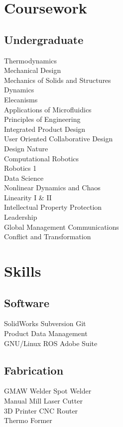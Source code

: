 \documentclass[]{deedy-resume-openfont}
\begin{document}
\begin{minipage}[t]{0.33\textwidth}
\section{Coursework}

\subsection{Undergraduate}

Thermodynamics \\
Mechanical Design \\
Mechanics of Solids and Structures \\
Dynamics \\
Elecanisms \\
Applications of Microfluidics \\
Principles of Engineering \\
Integrated Product Design\\
User Oriented Collaborative Design \\
Design Nature \\
Computational Robotics\\
Robotics 1 \\
Data Science \\
Nonlinear Dynamics and Chaos\\
Linearity I \& II\\
Intellectual Property Protection \\
Leadership \\
Global Management Communications\\
Conflict and Transformation\\
\sectionsep


\section{Skills}
\subsection{Software}
SolidWorks \textbullet{} Subversion \textbullet{} Git \\
Product Data Management \\
GNU/Linux \textbullet{} ROS %
\textbullet{} Adobe Suite
\sectionsep

\subsection{Fabrication}
GMAW Welder \textbullet{} Spot Welder \\
Manual Mill \textbullet{} Laser Cutter \\
3D Printer \textbullet{} CNC Router \\
Thermo Former
\sectionsep


\end{minipage}
\end{document}
